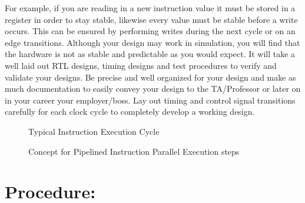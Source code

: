 \documentclass{article}
\begin{document}
For example, if you are reading in a new instruction value it must be stored in a register in order to stay stable, likewise every value must be stable before a write occurs. This can be ensured by performing writes during the next cycle or on an edge transitions. Although your design may work in simulation, you will find that the hardware is not as stable and predictable as you would expect. It will take a well laid out RTL designs, timing designs and test procedures to verify and validate your designs. Be precise and well organized for your design and make as much documentation to easily convey your design to the TA/Professor or later on in your career your employer/boss. Lay out timing and control signal transitions carefully for each clock cycle to completely develop a working design.

\begin{figure}[!htbp]
  \centering
  \caption{Typical Instruction Execution Cycle}
  \label{fig:iec}
\end{figure}

\begin{figure}[!htbp]
  \centering
  \caption{Concept for Pipelined Instruction Parallel Execution steps}
  \label{fig:pipeline_instruction_execution_example}
\end{figure}

\section{Procedure:}
\end{document}
